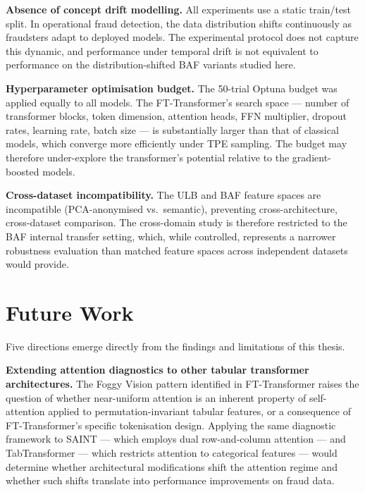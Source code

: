 \textbf{Absence of concept drift modelling.} All experiments use a static train/test split. In operational fraud detection, the data distribution shifts continuously as fraudsters adapt to deployed models. The experimental protocol does not capture this dynamic, and performance under temporal drift is not equivalent to performance on the distribution-shifted BAF variants studied here.

\textbf{Hyperparameter optimisation budget.} The 50-trial Optuna budget was applied equally to all models. The FT-Transformer's search space — number of transformer blocks, token dimension, attention heads, FFN multiplier, dropout rates, learning rate, batch size — is substantially larger than that of classical models, which converge more efficiently under TPE sampling. The budget may therefore under-explore the transformer's potential relative to the gradient-boosted models.

\textbf{Cross-dataset incompatibility.} The ULB and BAF feature spaces are incompatible (PCA-anonymised vs.\ semantic), preventing cross-architecture, cross-dataset comparison. The cross-domain study is therefore restricted to the BAF internal transfer setting, which, while controlled, represents a narrower robustness evaluation than matched feature spaces across independent datasets would provide.

\section{Future Work}
\label{sec:future_work}

Five directions emerge directly from the findings and limitations of this thesis.

\textbf{Extending attention diagnostics to other tabular transformer architectures.} The Foggy Vision pattern identified in FT-Transformer raises the question of whether near-uniform attention is an inherent property of self-attention applied to permutation-invariant tabular features, or a consequence of FT-Transformer's specific tokenisation design. Applying the same diagnostic framework to SAINT — which employs dual row-and-column attention — and TabTransformer — which restricts attention to categorical features — would determine whether architectural modifications shift the attention regime and whether such shifts translate into performance improvements on fraud data.

